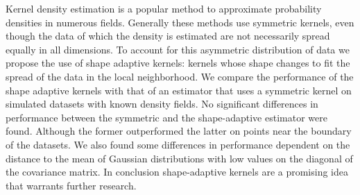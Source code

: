 \noindent Kernel density estimation is a popular method to approximate probability densities in numerous fields.
Generally these methods use symmetric kernels, even though the data of which the density is estimated are not necessarily spread equally in all dimensions. To account for this asymmetric distribution of data we propose the use of shape adaptive kernels: kernels whose shape changes to fit the spread of the data in the local neighborhood.
We compare the performance of the shape adaptive kernels with that of an estimator that uses a symmetric kernel on simulated datasets with known density fields.
No significant differences in performance between the symmetric and the shape-adaptive estimator were found. Although the former outperformed the latter on points near the boundary of the datasets. We also found some differences in performance dependent on the distance to the mean of Gaussian distributions with low values on the diagonal of the covariance matrix.  
In conclusion shape-adaptive kernels are a promising idea that warrants further research.
